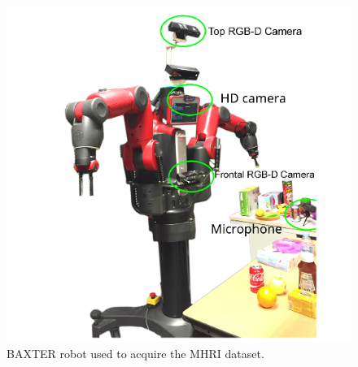 \documentclass[11pt,a4paper]{article}
\begin{document}
\begin{figure}[!h]
\centering
\includegraphics[scale=0.5]{Pictures/BAXTER_MHRI.png}
\caption{BAXTER robot used to acquire the MHRI dataset. \label{BAXTER_MHRI}}
\end{figure}
\end{document}
